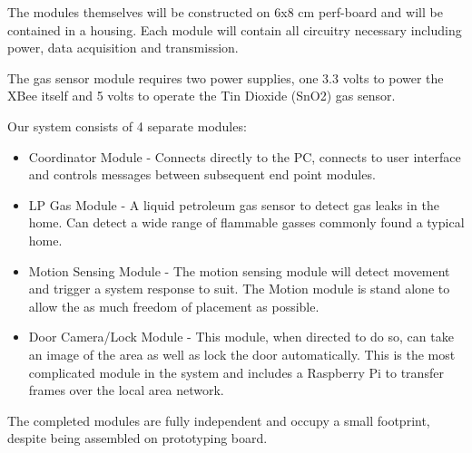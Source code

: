	\par The modules themselves will be constructed on 6x8 cm perf-board and will be contained in a housing. Each module will contain all circuitry necessary including power, data acquisition and transmission. 

	\par The gas sensor module requires two power supplies, one 3.3 volts to power the XBee itself and 5 volts to operate the Tin Dioxide (SnO2) gas sensor. \\
	\par Our system consists of 4 separate modules:
	\begin{itemize}
		\item Coordinator Module - Connects directly to the PC, connects to user interface and controls messages between subsequent end point modules. 
		\item LP Gas Module - A liquid petroleum gas sensor to detect gas leaks in the home. Can detect a wide range of flammable gasses commonly found a typical home.
		\item Motion Sensing Module - The motion sensing module will detect movement and trigger a system response to suit. The Motion module is stand alone to allow the as much freedom of placement as possible.
		\item Door Camera/Lock Module - This module, when directed to do so, can take an image of the area as well as lock the door automatically. This is the most complicated module in the system and includes a Raspberry Pi to transfer frames over the local area network.
	\end{itemize}
	\par The completed modules are fully independent and occupy a small footprint, despite being assembled on prototyping board. 

